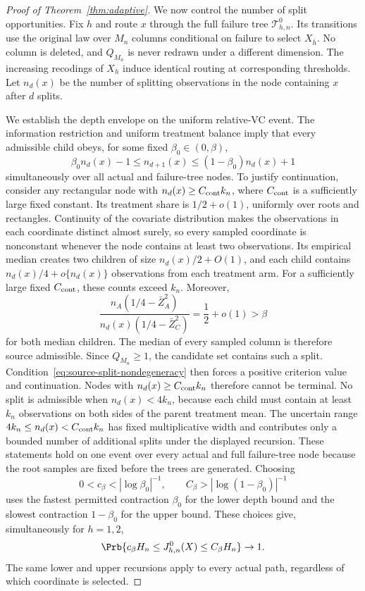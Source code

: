 \begin{appendix}
\begin{proof}[Proof of Theorem~\ref{thm:adaptive}]
We now control the number of split opportunities. Fix \(h\) and route \(x\)
through the full failure tree
\(\mathcal T_{h,n}^0\). Its transitions use the original law over \(M_n\)
columns conditional on failure to select \(X_{\bar h}\). No column is deleted,
and \(Q_{M_n}\) is never redrawn under a different dimension. The increasing
recodings of \(X_h\) induce identical routing at corresponding thresholds. Let
\(n_d(x)\) be the number of
splitting observations in the node containing \(x\) after \(d\) splits.

We establish the depth envelope on the uniform relative-VC event. The
information restriction and uniform treatment balance imply that every
admissible child obeys, for some fixed \(\beta_0\in(0,\beta)\),
\[
\beta_0n_d(x)-1\le n_{d+1}(x)
\le(1-\beta_0)n_d(x)+1
\]
simultaneously over all actual and failure-tree nodes. To justify continuation,
consider any rectangular node with \(n_d(x)\ge C_{\rm cont}k_n\), where
\(C_{\rm cont}\) is a sufficiently large fixed constant. Its treatment share is
\(1/2+o(1)\),
uniformly over roots and rectangles. Continuity of the covariate distribution
makes the observations in each coordinate distinct almost surely, so every
sampled coordinate is nonconstant whenever the node contains at least two
observations. Its empirical median creates
two children of size \(n_d(x)/2+O(1)\), and each child contains
\(n_d(x)/4+o\{n_d(x)\}\) observations from each treatment arm. For a sufficiently
large fixed \(C_{\rm cont}\), these counts exceed \(k_n\). Moreover,
\[
\frac{n_A(1/4-\bar Z_A^2)}
{n_d(x)(1/4-\bar Z_C^2)}=\frac12+o(1)>\beta
\]
for both median children. The median of every sampled column is therefore
source admissible. Since \(Q_{M_n}\ge1\), the candidate set contains such a
split. Condition~\eqref{eq:source-split-nondegeneracy} then forces a positive
criterion value and continuation. Nodes with
\(n_d(x)\ge C_{\rm cont}k_n\) therefore cannot be
terminal. No split is admissible when \(n_d(x)<4k_n\), because each child must
contain at least \(k_n\) observations on both sides of the parent treatment
mean. The uncertain range
\(4k_n\le n_d(x)<C_{\rm cont}k_n\) has fixed multiplicative
width and contributes
only a bounded number of additional splits under the displayed recursion.
These statements hold on one event over every actual and full failure-tree node
because the root samples are fixed before the trees are generated. Choosing
\[
0<c_\beta<|\log\beta_0|^{-1},
\qquad C_\beta>|\log(1-\beta_0)|^{-1}
\]
uses the fastest permitted contraction \(\beta_0\) for the lower depth bound and
the slowest contraction \(1-\beta_0\) for the upper bound. These choices give,
simultaneously for \(h=1,2\),
\begin{equation}\label{eq:app-random-depth-envelope}
\Prb\{c_\beta H_n\le J_{h,n}^0(X)\le C_\beta H_n\}\to1.
\end{equation}
The same lower and upper
recursions apply to every actual path, regardless of which coordinate is
selected.


\end{proof}
\end{appendix}
